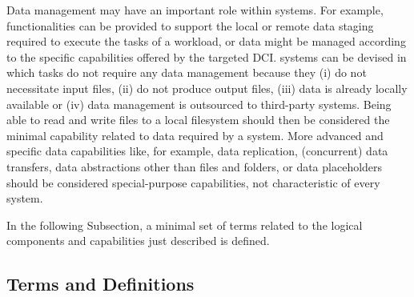 \documentclass{sig-alternate}
\begin{document}
Data management may have an important role within \pilot systems. For example,
functionalities can be provided to support the local or remote data staging
required to execute the tasks of a workload, or data might be managed according
to the specific capabilities offered by the targeted DCI. \pilot systems can be
devised in which tasks do not require any data management because they (i) do
not necessitate input files, (ii) do not produce output files, (iii) data is
already locally available or (iv) data management is outsourced to third-party
systems. Being able to read and write files to a local filesystem should then
be considered the minimal capability related to data required by a \pilot
system. More advanced and specific data capabilities like, for example, data
replication, (concurrent) data transfers, data abstractions other than files
and folders, or data placeholders should be considered special-purpose
capabilities, not characteristic of every \pilot system.

In the following Subsection, a minimal set of terms related to the
logical components and capabilities just described is defined.

\subsection{Terms and Definitions}
\label{subsec:3.2}
\end{document}
